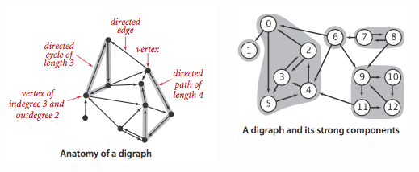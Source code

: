 \documentclass[aspectratio=169]{beamer} %
\begin{document}
\begin{frame}{}
    \begin{columns}
        \begin{column}{0.5\textwidth}
            \begin{center}
                \includegraphics[width=1.0\linewidth,height=0.7\textheight]{../images/digraph-anatomy.png}
            \end{center}
         \end{column}
         \begin{column}{0.5\textwidth}
             \begin{center}
                \includegraphics[width=1.0\linewidth,height=0.7\textheight]{../images/strong-components.png}
             \end{center}
        \end{column}
    \end{columns}
\end{frame}
\end{document}
